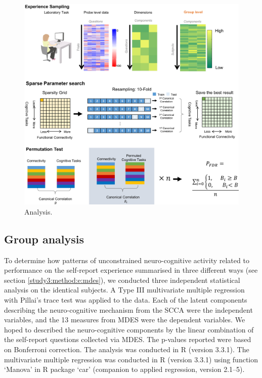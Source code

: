 \begin{figure}[H]
	\centering
	\includegraphics[width=1\textwidth]{study3/image/study3fig1.jpg}
	\caption{Analysis.}
	\label{fig:study3:fig1}
\end{figure}

\subsection{Group analysis}
\label{study3:method:g}

To determine how patterns of unconstrained neuro-cognitive activity related to performance on the self-report experience summarised in three different ways (see section \ref{study3:method:e:mdes}),
we conducted three independent statistical analysis on the identical subjects. A Type III multivariate multiple regression with Pillai's trace test was applied to the data. Each of the latent components describing the neuro-cognitive mechanism from the SCCA were the independent variables, and the 13 measures from MDES were the dependent variables. We hoped to described the neuro-cognitive components by the linear combination of the self-report questions collected via MDES. The p-values reported were based on Bonferroni correction. The analysis was conducted in R (version 3.3.1). The multivariate multiple regression was conducted in R (version 3.3.1) using function ‘Manova’ in R package ‘car’ (companion to applied regression, version 2.1–5).


